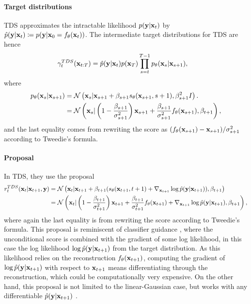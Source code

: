 \paragraph{Target distributions} TDS approximates the intractable likelihood $p(\mathbf{y}|\mathbf{x}_{t})$ by $\hat p(\mathbf{y}|\mathbf{x}_{t}) \coloneqq p(\mathbf{y}|\mathbf{x}_0=f_\theta(\mathbf{x}_{t}))$. The intermediate target distributions for TDS are hence
\begin{align}
\gamma_t^{TDS}(\mathbf{x}_{t:T}) &= \hat p(\mathbf{y}|\mathbf{x}_{t}) p(\mathbf{x}_T)\prod_{s=t}^{T-1} p_{\theta}(\mathbf{x}_s|\mathbf{x}_{s+1}), 
\end{align}
where
\begin{align}
p_\theta(\mathbf{x}_s|\mathbf{x}_{s+1}) 
&= \mathcal{N}\left(\mathbf{x}_s|\mathbf{x}_{s+1} + \beta_{s+1} s_\theta(\mathbf{x}_{s+1}, s+1), \beta_{s+1}^2I\right). \\
&= \mathcal{N}\left(\mathbf{x}_s |\left(1 -\frac{\beta_{s+1}}{\sigma_{s+1}^2}\right)\mathbf{x}_{s+1} + \frac{\beta_{s+1}}{\sigma_{s+1}^2}f_\theta(\mathbf{x}_{s+1}), \beta_{t+1}\right),
\end{align}
and the last equality comes from rewriting the score as $(f_\theta(\mathbf{x}_{s+1}) - \mathbf{x}_{s+1})/\sigma_{s+1}^2$ according to Tweedie's formula.

\paragraph{Proposal}
In TDS, they use the proposal
\begin{align}
    r_t^{TDS}(\mathbf{x}_{t}|\mathbf{x}_{t+1}, \mathbf{y}) 
    &= \mathcal{N}\left(\mathbf{x}_{t}|\mathbf{x}_{t+1} + \beta_{t+1}(s_\theta(\mathbf{x}_{t+1}, t+1) + \nabla_{\mathbf{x}_{t+1}} \log \hat p(\mathbf{y}|\mathbf{x}_{t+1})), \beta_{t+1}\right) \\
    &= \mathcal{N}\left(\mathbf{x}_{t}|\left(1-\frac{\beta_{t+1}}{\sigma_{t+1}^2}\right)\mathbf{x}_{t+1} + \frac{\beta_{t+1}}{\sigma_{t+1}^2}f_\theta(\mathbf{x}_{t+1}) + \nabla_{\mathbf{x}_{t+1}} \log \hat p(\mathbf{y}|\mathbf{x}_{t+1}), \beta_{t+1}\right),
\end{align}
where again the last equality is from rewriting the score according to Tweedie's formula. This proposal is reminiscent of classifier guidance \citep{dhariwal_diffusion_2021-1}, where the unconditional score is combined with the gradient of some log likelihood, in this case the log likelihood $\log \hat p(\mathbf{y}|\mathbf{x}_{t+1})$ from the target distribution. As this likelihood relies on the reconstruction $f_\theta(\mathbf{x}_{t+1})$, computing the gradient of $\log \hat p(\mathbf{y}|\mathbf{x}_{t+1})$ with respect to $\mathbf{x}_{t+1}$ means differentiating through the reconstruction, which could be computationally very expensive. On the other hand, this proposal is not limited to the linear-Gaussian case, but works with any differentiable $\hat p(\mathbf{y}|\mathbf{x}_{t+1})$%
. 


